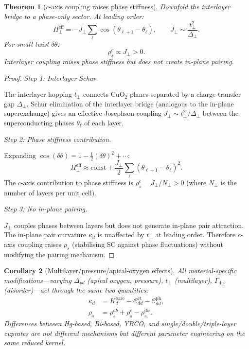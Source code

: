 \documentclass[12pt]{article}
\theoremstyle{plain}
\newtheorem{theorem}{Theorem}[section]
\newtheorem{corollary}[theorem]{Corollary}
\theoremstyle{definition}
\numberwithin{equation}{section}
\newcommand{\eff}{\mathrm{eff}}
\begin{document}
\begin{theorem}[$c$-axis coupling raises phase stiffness]\label{thm:caxis}
Downfold the interlayer bridge to a phase-only sector.  At leading
order:
\begin{equation}\label{eq:Hperp}
H_\perp^{\eff} = -J_\perp\sum_\ell
\cos(\theta_{\ell+1}-\theta_\ell),
\qquad J_\perp\sim\frac{t_\perp^2}{\Delta_\perp}.
\end{equation}
For small twist $\delta\theta$:
\begin{equation}\label{eq:rhosc}
\boxed{\rho_s^c \propto J_\perp > 0.}
\end{equation}
Interlayer coupling raises phase stiffness but does not create
in-plane pairing.
\end{theorem}

\begin{proof}
\emph{Step 1: Interlayer Schur.}

The interlayer hopping $t_\perp$ connects CuO$_2$ planes
separated by a charge-transfer gap $\Delta_\perp$.  Schur
elimination of the interlayer bridge (analogous to the in-plane
superexchange) gives an effective Josephson coupling
$J_\perp\sim t_\perp^2/\Delta_\perp$ between the
superconducting phases $\theta_\ell$ of each layer.

\emph{Step 2: Phase stiffness contribution.}

Expanding $\cos(\delta\theta)=1-\frac{1}{2}(\delta\theta)^2+\cdots$:
\begin{equation}
H_\perp^{\eff}\approx\text{const}
+\frac{J_\perp}{2}\sum_\ell(\theta_{\ell+1}-\theta_\ell)^2.
\end{equation}
The $c$-axis contribution to phase stiffness is
$\rho_s^c=J_\perp/N_\perp>0$ (where $N_\perp$ is the number of
layers per unit cell).

\emph{Step 3: No in-plane pairing.}

$J_\perp$ couples phases between layers but does not generate
in-plane pair attraction.  The in-plane pair curvature $\kappa_d$
is unaffected by $t_\perp$ at leading order.  Therefore $c$-axis
coupling raises $\rho_s$ (stabilising SC against phase fluctuations)
without modifying the pairing mechanism.
\end{proof}

\begin{corollary}[Multilayer/pressure/apical-oxygen effects]\label{cor:material}
All material-specific modifications---varying $\Delta_{pd}$ (apical
oxygen, pressure), $t_\perp$ (multilayer), $\Gamma_{\mathrm{dis}}$
(disorder)---act through the same two quantities:
\begin{align}
\kappa_d &= K_d^{\mathrm{bare}}
-\mathcal{C}_{dd}^{\mathrm{ct}}-\mathcal{C}_{dd}^{\mathrm{ph}},
\label{eq:kappafinal}\\
\rho_s &= \rho_s^{ab}+\rho_s^c-\rho_s^{\mathrm{dis}}.
\label{eq:rhosfinal}
\end{align}
Differences between Hg-based, Bi-based, YBCO, and
single/double/triple-layer cuprates are not different mechanisms
but different parameter engineering on the same reduced kernel.
\end{corollary}
\end{document}
